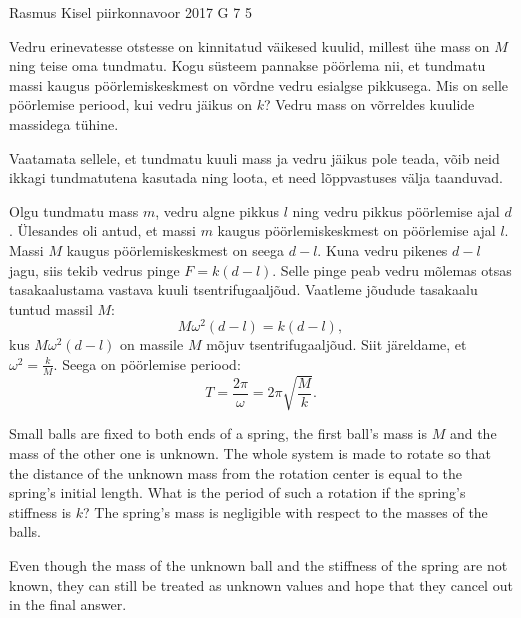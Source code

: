 {Rasmus Kisel} %
{piirkonnavoor} %
{2017} %
{G 7} %
{5} %
{
\ifStatement
Vedru erinevatesse otstesse on kinnitatud väikesed kuulid, millest ühe mass on $M$ ning teise oma tundmatu. Kogu süsteem pannakse pöörlema nii, et tundmatu massi kaugus pöörlemiskeskmest on võrdne vedru esialgse pikkusega. Mis on selle pöörlemise periood, kui vedru jäikus on $k$? Vedru mass on võrreldes kuulide massidega tühine.
\fi


\ifHint
Vaatamata sellele, et tundmatu kuuli mass ja vedru jäikus pole teada, võib neid ikkagi tundmatutena kasutada ning loota, et need lõppvastuses välja taanduvad.
\fi


\ifSolution
Olgu tundmatu mass $m$, vedru algne pikkus $l$ ning vedru pikkus pöörlemise ajal $d$. Ülesandes oli antud, et massi $m$ kaugus pöörlemiskeskmest on pöörlemise ajal $l$. Massi $M$ kaugus pöörlemiskeskmest on seega $d-l$.
Kuna vedru pikenes $d-l$ jagu, siis tekib vedrus pinge $F=k(d-l)$. Selle pinge peab vedru mõlemas otsas tasakaalustama vastava kuuli tsentrifugaaljõud. Vaatleme jõudude tasakaalu tuntud massil $M$:
\begin{equation*}
M\omega^2(d-l)=k(d-l),
\end{equation*}
kus $M\omega^2(d-l)$ on massile $M$ mõjuv tsentrifugaaljõud.
Siit järeldame, et $\omega^2=\frac{k}{M}$. Seega on pöörlemise periood:
\begin{equation*}
T=\frac{2\pi}{\omega}=2\pi \sqrt{\frac{M}{k}}.
\end{equation*}
\fi


\ifEngStatement
Small balls are fixed to both ends of a spring, the first ball’s mass is $M$ and the mass of the other one is unknown. The whole system is made to rotate so that the distance of the unknown mass from the rotation center is equal to the spring’s initial length. What is the period of such a rotation if the spring’s stiffness is $k$? The spring’s mass is negligible with respect to the masses of the balls.
\fi


\ifEngHint
Even though the mass of the unknown ball and the stiffness of the spring are not known, they can still be treated as unknown values and hope that they cancel out in the final answer.
\fi


}
